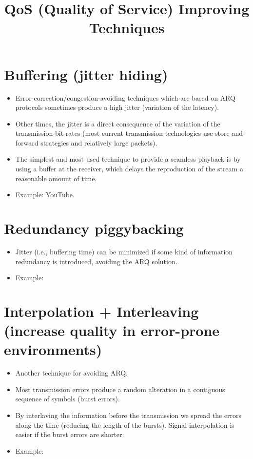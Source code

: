 \title{QoS (Quality of Service) Improving Techniques}

\maketitle
\tableofcontents


\section{Buffering (jitter hiding)}

\begin{itemize}
\item Error-correction/congestion-avoiding techniques which are based
  on ARQ protocols sometimes produce a high jitter (variation of the
  latency).
\item Other times, the jitter is a direct consequence of the variation
  of the transmission bit-rates (most current transmission
  technologies use store-and-forward strategies and relatively large
  packets).
\item The simplest and most used technique to provide a seamless
  playback is by using a buffer at the receiver, which delays the
  reproduction of the stream a reasonable amount of time.
\item Example: YouTube.
\end{itemize}


\section{Redundancy piggybacking}

\begin{itemize}
\item Jitter (i.e., buffering time) can be minimized if some kind of
  information redundancy is introduced, avoiding the ARQ solution.
\item Example:
\end{itemize}


\section{Interpolation + Interleaving (increase quality in error-prone environments)}

\begin{itemize}
\item Another technique for avoiding ARQ.
\item Most transmission errors produce a random alteration in a contiguous
  sequence of symbols (burst errors).
\item By interlaving the information before the transmission we spread
  the errors along the time (reducing the length of the bursts). Signal
  interpolation is easier if the burst errors are shorter.
\item Example:
\end{itemize}

